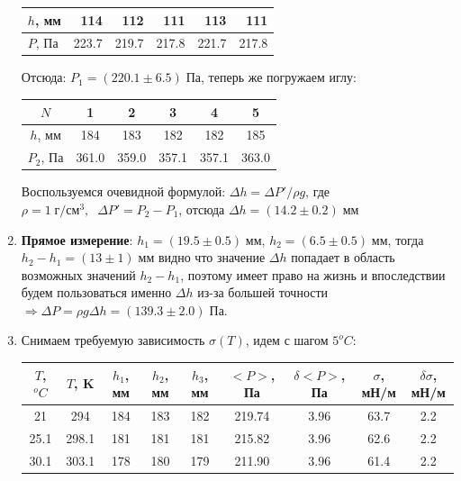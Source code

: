 \documentclass[12 pt, a4paper]{article}%
\begin{document}
\begin{enumerate}
\begin{center}
\begin{tabular}{|l|r|r|r|r|r|}
    $h$, мм   & 114                    & 112                    & 111                    & 113                    & 111                    \\ \hline
    $P$, Па & 223.7                  & 219.7                  & 217.8                  & 221.7                  & 217.8                  \\ \hline
    \end{tabular}
    \end{center}
    Отсюда: $P_1 = (220.1 \pm 6.5) \;Па$, теперь же погружаем иглу: 
    \begin{center}
    \begin{tabular}{|c|c|c|c|c|c|}
    \hline
    $N$       & 1     & 2     & 3     & 4     & 5     \\ \hline
    $h$, мм   & 184   & 183   & 182   & 182   & 185   \\ \hline
    $P_2$, Па & 361.0 & 359.0 & 357.1 & 357.1 & 363.0 \\ \hline
    \end{tabular}
    \end{center}
    Воспользуемся очевидной формулой: $\Delta h = \Delta P'/ \rho g$, где $\rho = 1\; г/см^3,\;\; \Delta P' = P_2 - P_1$, отсюда $\Delta h = (14.2 \pm 0.2)\; мм$ \\
    \item \textbf{Прямое измерение}: $h_1 = (19.5\pm0.5)\; мм$, $h_2 = (6.5\pm0.5)\; мм$, тогда $h_2 - h_1 = (13\pm1)\; мм$ видно что значение $\Delta h$ попадает в область возможных значений $h_2 - h_1$, поэтому имеет право на жизнь и впоследствии будем пользоваться именно $\Delta h$ из-за большей точности $\Rightarrow \Delta P = \rho g \Delta h = (139.3\pm2.0)\; Па$.
    \item Снимаем требуемую зависимость $\sigma (T)$, идем с шагом $5^oC$:
    \begin{center}
    \begin{tabular}{|c|c|c|c|c|c|c|c|c|}
    \hline
    $T$, $^oC$ & $T$, K & $h_1$, мм & $h_2$, мм & $h_3$, мм & $<P>$, Па & $\delta <P>$, Па & $\sigma$, мН/м & $\delta \sigma$, мН/м \\ \hline
    21         & 294    & 184       & 183       & 182       & 219.74    & 3.96             & 63.7           & 2.2                   \\ \hline
    25.1       & 298.1  & 181       & 181       & 181       & 215.82    & 3.96             & 62.6           & 2.2                   \\ \hline
    30.1       & 303.1  & 178       & 180       & 179       & 211.90    & 3.96             & 61.4           & 2.2                   \\ \hline

\end{tabular}
\end{center}
\end{enumerate}
\end{document}
